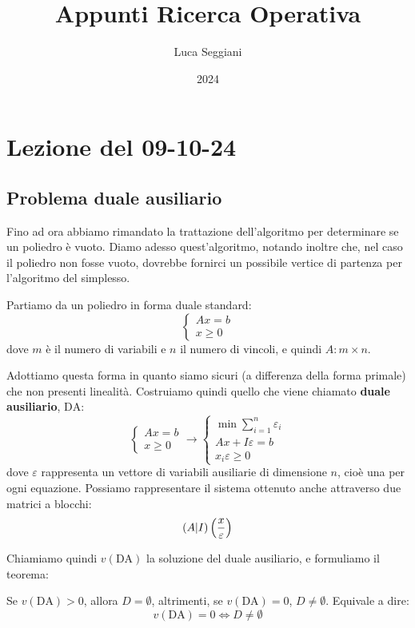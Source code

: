 \documentclass[a4paper,11pt]{article}
\title{Appunti Ricerca Operativa}
\author{Luca Seggiani}
\date{2024}
\begin{document}
\section{Lezione del 09-10-24}

\thispagestyle{empty}
\pagestyle{fancy}

\subsection{Problema duale ausiliario}
Fino ad ora abbiamo rimandato la trattazione dell'algoritmo per determinare se un poliedro è vuoto.
Diamo adesso quest'algoritmo, notando inoltre che, nel caso il poliedro non fosse vuoto, dovrebbe fornirci un possibile vertice di partenza per l'algoritmo del simplesso.

Partiamo da un poliedro in forma duale standard:
\[
	\begin{cases}
		Ax = b \\
		x \geq 0
	\end{cases}
\]
dove $m$ è il numero di variabili e $n$ il numero di vincoli, e quindi $A: m \times n$.

Adottiamo questa forma in quanto siamo sicuri (a differenza della forma primale) che non presenti linealità.
Costruiamo quindi quello che viene chiamato \textbf{duale ausiliario}, $\text{DA}$:
\[
	\begin{cases}	
		Ax = b \\
		x \geq 0
	\end{cases}
	\rightarrow
	\begin{cases}
		\min \sum_{i=1}^n	\varepsilon_i \\ 
		Ax + I\varepsilon = b \\
		x_i \varepsilon \geq 0
	\end{cases}
\]
dove $\varepsilon$ rappresenta un vettore di variabili ausiliarie di dimensione $n$, cioè una per ogni equazione.
Possiamo rappresentare il sistema ottenuto anche attraverso due matrici a blocchi:
$$
\left( A | I \right) \left( x \over \varepsilon \right) 
$$

Chiamiamo quindi $v(\text{DA})$ la soluzione del duale ausiliario, e formuliamo il teorema:
\begin{theorem}{}
	Se $v(\text{DA}) > 0$, allora $D = \emptyset$, altrimenti, se $v(\text{DA}) = 0$, $D \neq \emptyset$.
	Equivale a dire:
	$$
	v(\text{DA}) = 0 \Leftrightarrow D \neq \emptyset
	$$
\end{theorem}
\end{document}
